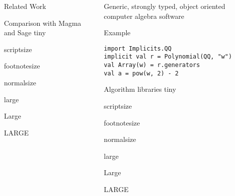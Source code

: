 \documentclass[final]{beamer}
\begin{document}
\begin{frame}[fragile]
\begin{columns}[t]
\begin{column}{.3\linewidth}
\begin{block}{\large Related Work}
\par
  \end{block}
  \hfill
  \begin{block}{\large Comparison with Magma and Sage}
      \centering
      {\tiny tiny}\par
      {\scriptsize scriptsize}\par
      {\footnotesize footnotesize}\par
      {\normalsize normalsize}\par
      {\large large}\par
      {\Large Large}\par
      {\LARGE LARGE}\par
  \end{block}

\end{column}

\begin{column}{.3\linewidth}
 
  \begin{block}{\large Generic, strongly typed, object oriented computer algebra software}
      \centering
  \end{block}
  \hfill
  \begin{block}{\large Example}
\scriptsize %
\begin{lstlisting} 
import Implicits.QQ
implicit val r = Polynomial(QQ, "w")
val Array(w) = r.generators
val a = pow(w, 2) - 2 
\end{lstlisting} 
  \end{block}
  \hfill
  \begin{block}{\large Algorithm libraries}
      \centering
      {\tiny tiny}\par
      {\scriptsize scriptsize}\par
      {\footnotesize footnotesize}\par
      {\normalsize normalsize}\par
      {\large large}\par
      {\Large Large}\par
      {\LARGE LARGE}\par
  \end{block}


\end{column}
\end{columns}
\end{frame}
\end{document}
